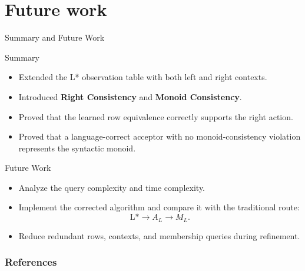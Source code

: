 \documentclass{beamer}
\begin{document}
\section{Future work}

\begin{frame}{Summary and Future Work}
    \begin{block}{Summary}
        \begin{itemize}
            \item Extended the L* observation table with both left and right contexts.
            \item Introduced \textbf{Right Consistency} and \textbf{Monoid Consistency}.
            \item Proved that the learned row equivalence correctly supports the right action.
            \item Proved that a language-correct acceptor with no monoid-consistency violation represents the syntactic monoid.
        \end{itemize}
    \end{block}

    \begin{block}{Future Work}
        \begin{itemize}
            \item Analyze the query complexity and time complexity.
            \item Implement the corrected algorithm and compare it with the traditional route:
            \[
                \text{L*}\to A_L\to M_L.
            \]
            \item Reduce redundant rows, contexts, and membership queries during refinement.
        \end{itemize}
    \end{block}
\end{frame}

\begin{frame}[allowframebreaks] 
    \frametitle{References}
    
    
     
\end{frame}
\end{document}
